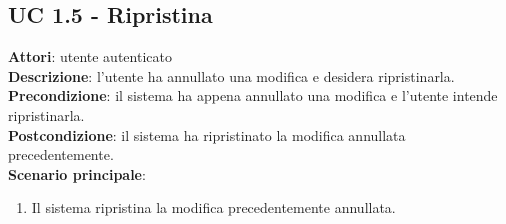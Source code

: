 \subsection{UC 1.5 - Ripristina}{
	\label{uc1.5}
	\textbf{Attori}: utente autenticato \\
	\textbf{Descrizione}: l'utente ha annullato una modifica e desidera ripristinarla. \\
	\textbf{Precondizione}: il sistema ha appena annullato una modifica e l'utente intende ripristinarla.	\\
	\textbf{Postcondizione}: il sistema ha ripristinato la modifica annullata precedentemente.	\\
	\textbf{Scenario principale}:
	\begin{enumerate}
		\item Il sistema ripristina la modifica precedentemente annullata.
	\end{enumerate}			
	}
